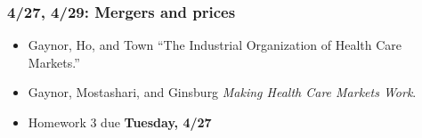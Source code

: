 \documentclass[11pt,]{article}
\providecommand{\tightlist}{%
  \setlength{\itemsep}{0pt}\setlength{\parskip}{0pt}}
\begin{document}
\hypertarget{mergers-and-prices}{%
\subsubsection{4/27, 4/29: Mergers and
prices}\label{mergers-and-prices}}

\begin{itemize}
\tightlist
\item
  Gaynor, Ho, and Town ``The Industrial Organization of Health Care
  Markets.''
\item
  Gaynor, Mostashari, and Ginsburg \emph{Making Health Care Markets
  Work}.
\item
  Homework 3 due \textbf{Tuesday, 4/27}
\end{itemize}
\end{document}
